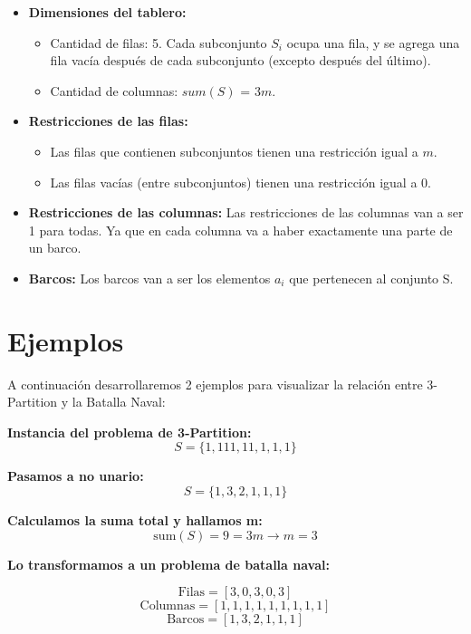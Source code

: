 \begin{itemize}
    \item \textbf{Dimensiones del tablero:} %
    \begin{itemize}
        \item Cantidad de filas: 5. Cada subconjunto \(S_i\) ocupa una fila, y se agrega una fila vacía después de cada subconjunto (excepto después del último).
        \item Cantidad de columnas: $sum(S)$ = \(3m\). %
    \end{itemize}

    \item \textbf{Restricciones de las filas:}
    \begin{itemize}
        \item Las filas que contienen subconjuntos tienen una restricción igual a $m$.
        \item Las filas vacías (entre subconjuntos) tienen una restricción igual a 0.
    \end{itemize}

    \item \textbf{Restricciones de las columnas:} Las restricciones de las columnas van a ser 1 para todas. Ya que en cada columna va a haber exactamente una parte de un barco.

    \item \textbf{Barcos:} Los barcos van a ser los elementos $a_i$ que pertenecen al conjunto S.
\end{itemize}



\section*{Ejemplos}

A continuación desarrollaremos 2 ejemplos para visualizar la relación entre 3-Partition y la Batalla Naval:

\textbf{Instancia del problema de 3-Partition:}
\[
S = \{1, 111, 11, 1, 1, 1\}
\]

\textbf{Pasamos a no unario:}
\[
S = \{1, 3, 2, 1, 1, 1\}
\]

\textbf{Calculamos la suma total y hallamos m:}
\[
\text{sum}(S) = 9 = 3m \rightarrow m = 3
\]

\textbf{Lo transformamos a un problema de batalla naval:}

\[
\text{Filas} = [3, 0, 3, 0, 3]
\]
\[
\text{Columnas} = [1, 1, 1, 1, 1, 1, 1, 1, 1]
\]
\[
\text{Barcos} = [1, 3, 2, 1, 1, 1]
\]

